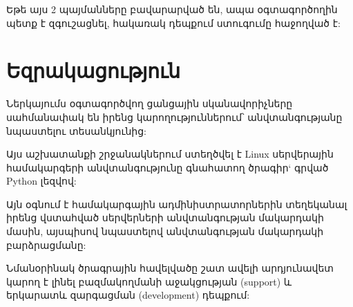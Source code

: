 \documentclass[a4paper,12pt]{article}
\begin{document}
\begin{sloppypar}
Եթե այս 2 պայմանները բավարարված են, ապա օգտագործողին պետք է զգուշացնել,
հակառակ դեպքում ստուգումը հաջողված է:


\newpage
\section{Եզրակացություն}


Ներկայումս օգտագործվող ցանցային սկանավորիչները սահմանափակ են
իրենց կարողություններում՝ անվտանգությանը նպաստելու
տեսանկյունից:

Այս աշխատանքի շրջանակներում ստեղծվել է Linux սերվերային
համակարգերի անվտանգությունը գնահատող
ծրագիր` գրված Python լեզվով:

Այն օգնում է համակարգային ադմինիստրատորներին տեղեկանալ
իրենց վստահված սերվերների անվտանգության մակարդակի մասին,
այսպիսով նպաստելով անվտանգության մակարդակի բարձրացմանը:

Նմանօրինակ ծրագրային հավելվածը շատ ավելի արդյունավետ կարող է
լինել բազմակողմանի աջակցության (support) և երկարատև զարգացման
(development) դեպքում:


\newpage

\end{sloppypar}
\end{document}
